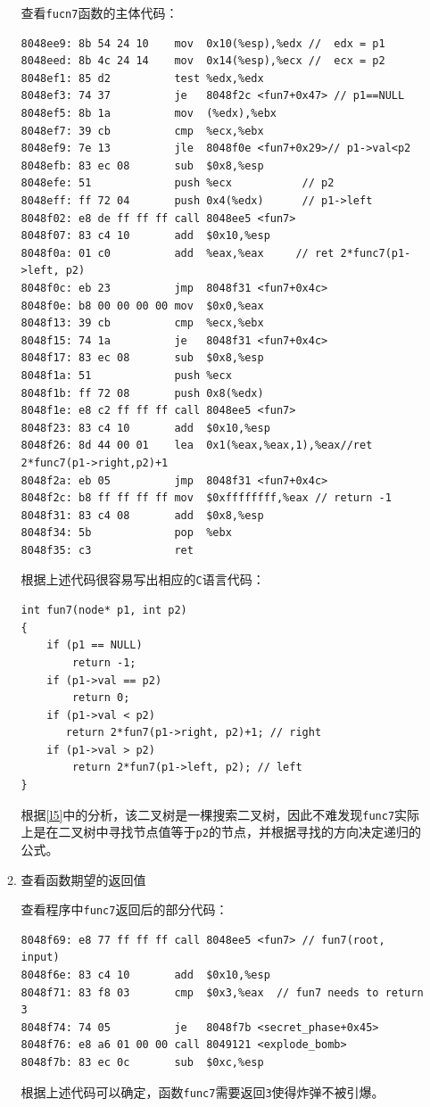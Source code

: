 \documentclass{paper}
\begin{document}
\begin{enumerate}
\begin{enumerate}
查看\verb|fucn7|函数的主体代码：
\begin{lstlisting}
8048ee9: 8b 54 24 10    mov  0x10(%esp),%edx //  edx = p1
8048eed: 8b 4c 24 14    mov  0x14(%esp),%ecx //  ecx = p2
8048ef1: 85 d2          test %edx,%edx
8048ef3: 74 37          je   8048f2c <fun7+0x47> // p1==NULL
8048ef5: 8b 1a          mov  (%edx),%ebx
8048ef7: 39 cb          cmp  %ecx,%ebx
8048ef9: 7e 13          jle  8048f0e <fun7+0x29>// p1->val<p2
8048efb: 83 ec 08       sub  $0x8,%esp
8048efe: 51             push %ecx           // p2
8048eff: ff 72 04       push 0x4(%edx)      // p1->left
8048f02: e8 de ff ff ff call 8048ee5 <fun7>
8048f07: 83 c4 10       add  $0x10,%esp
8048f0a: 01 c0          add  %eax,%eax     // ret 2*func7(p1->left, p2)
8048f0c: eb 23          jmp  8048f31 <fun7+0x4c>
8048f0e: b8 00 00 00 00 mov  $0x0,%eax
8048f13: 39 cb          cmp  %ecx,%ebx
8048f15: 74 1a          je   8048f31 <fun7+0x4c>
8048f17: 83 ec 08       sub  $0x8,%esp
8048f1a: 51             push %ecx
8048f1b: ff 72 08       push 0x8(%edx)
8048f1e: e8 c2 ff ff ff call 8048ee5 <fun7>
8048f23: 83 c4 10       add  $0x10,%esp
8048f26: 8d 44 00 01    lea  0x1(%eax,%eax,1),%eax//ret 2*func7(p1->right,p2)+1
8048f2a: eb 05          jmp  8048f31 <fun7+0x4c>
8048f2c: b8 ff ff ff ff mov  $0xffffffff,%eax // return -1
8048f31: 83 c4 08       add  $0x8,%esp
8048f34: 5b             pop  %ebx
8048f35: c3             ret
\end{lstlisting}
根据上述代码很容易写出相应的\verb|C|语言代码：
\begin{lstlisting}
int fun7(node* p1, int p2)
{
    if (p1 == NULL)
        return -1;
    if (p1->val == p2)
        return 0;
    if (p1->val < p2)
       return 2*fun7(p1->right, p2)+1; // right
    if (p1->val > p2)
        return 2*fun7(p1->left, p2); // left
}
\end{lstlisting}
根据\ref{l5}中的分析，该二叉树是一棵搜索二叉树，因此不难发现\verb|func7|实际上是在二叉树中寻找节点值等于\verb|p2|的节点，并根据寻找的方向决定递归的公式。

\item 查看函数期望的返回值

查看程序中\verb|func7|返回后的部分代码：
\begin{lstlisting}
8048f69: e8 77 ff ff ff call 8048ee5 <fun7> // fun7(root, input)
8048f6e: 83 c4 10       add  $0x10,%esp
8048f71: 83 f8 03       cmp  $0x3,%eax  // fun7 needs to return 3
8048f74: 74 05          je   8048f7b <secret_phase+0x45>
8048f76: e8 a6 01 00 00 call 8049121 <explode_bomb>
8048f7b: 83 ec 0c       sub  $0xc,%esp
\end{lstlisting}
根据上述代码可以确定，函数\verb|func7|需要返回\verb|3|使得炸弹不被引爆。


\end{enumerate}
\end{enumerate}
\end{document}
